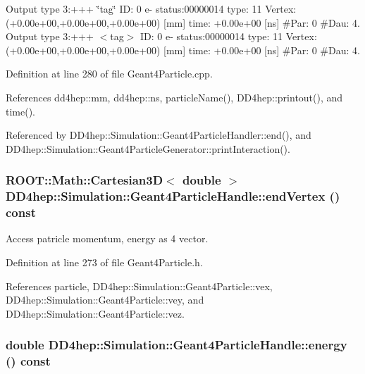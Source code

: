 Output type 3:+++ \char`\"{}tag\char`\"{} ID: 0 e-\/ status:00000014 type: 11 Vertex:(+0.00e+00,+0.00e+00,+0.00e+00) \mbox{[}mm\mbox{]} time: +0.00e+00 \mbox{[}ns\mbox{]} \#Par: 0 \#Dau: 4. Output type 3:+++ $<$tag$>$ ID: 0 e-\/ status:00000014 type: 11 Vertex:(+0.00e+00,+0.00e+00,+0.00e+00) \mbox{[}mm\mbox{]} time: +0.00e+00 \mbox{[}ns\mbox{]} \#Par: 0 \#Dau: 4. 

Definition at line 280 of file Geant4Particle.cpp.

References dd4hep::mm, dd4hep::ns, particleName(), DD4hep::printout(), and time().

Referenced by DD4hep::Simulation::Geant4ParticleHandler::end(), and DD4hep::Simulation::Geant4ParticleGenerator::printInteraction().\hypertarget{class_d_d4hep_1_1_simulation_1_1_geant4_particle_handle_a147c27b19dc8ef86584ddcad799538c3}{
\subsubsection[{endVertex}]{\setlength{\rightskip}{0pt plus 5cm}ROOT::Math::Cartesian3D$<$ double $>$ DD4hep::Simulation::Geant4ParticleHandle::endVertex () const}}
\label{class_d_d4hep_1_1_simulation_1_1_geant4_particle_handle_a147c27b19dc8ef86584ddcad799538c3}


Access patricle momentum, energy as 4 vector. 

Definition at line 273 of file Geant4Particle.h.

References particle, DD4hep::Simulation::Geant4Particle::vex, DD4hep::Simulation::Geant4Particle::vey, and DD4hep::Simulation::Geant4Particle::vez.\hypertarget{class_d_d4hep_1_1_simulation_1_1_geant4_particle_handle_a1f36d76d895f9e7eb7489db893d7eb8a}{
\subsubsection[{energy}]{\setlength{\rightskip}{0pt plus 5cm}double DD4hep::Simulation::Geant4ParticleHandle::energy () const}}
\label{class_d_d4hep_1_1_simulation_1_1_geant4_particle_handle_a1f36d76d895f9e7eb7489db893d7eb8a}


